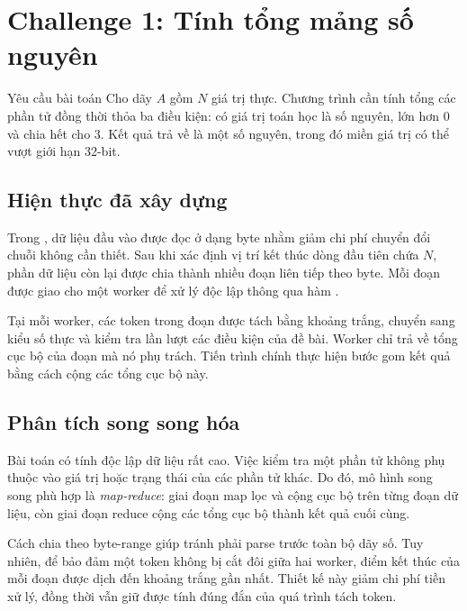 \section{Challenge 1: Tính tổng mảng số nguyên}
\label{sec:challenge1}

\begin{requirementbox}{Yêu cầu bài toán}
Cho dãy $A$ gồm $N$ giá trị thực. Chương trình cần tính tổng các phần tử đồng thời thỏa ba điều kiện: có giá trị toán học là số nguyên, lớn hơn 0 và chia hết cho 3. Kết quả trả về là một số nguyên, trong đó miền giá trị có thể vượt giới hạn 32-bit.
\end{requirementbox}

\subsection{Hiện thực đã xây dựng}
Trong , dữ liệu đầu vào được đọc ở dạng byte nhằm giảm chi phí chuyển đổi chuỗi không cần thiết. Sau khi xác định vị trí kết thúc dòng đầu tiên chứa $N$, phần dữ liệu còn lại được chia thành nhiều đoạn liên tiếp theo byte. Mỗi đoạn được giao cho một worker để xử lý độc lập thông qua hàm .

Tại mỗi worker, các token trong đoạn được tách bằng khoảng trắng, chuyển sang kiểu số thực và kiểm tra lần lượt các điều kiện của đề bài. Worker chỉ trả về tổng cục bộ của đoạn mà nó phụ trách. Tiến trình chính thực hiện bước gom kết quả bằng cách cộng các tổng cục bộ này.

\subsection{Phân tích song song hóa}
Bài toán có tính độc lập dữ liệu rất cao. Việc kiểm tra một phần tử không phụ thuộc vào giá trị hoặc trạng thái của các phần tử khác. Do đó, mô hình song song phù hợp là \textit{map-reduce}: giai đoạn map lọc và cộng cục bộ trên từng đoạn dữ liệu, còn giai đoạn reduce cộng các tổng cục bộ thành kết quả cuối cùng.

Cách chia theo byte-range giúp tránh phải parse trước toàn bộ dãy số. Tuy nhiên, để bảo đảm một token không bị cắt đôi giữa hai worker, điểm kết thúc của mỗi đoạn được dịch đến khoảng trắng gần nhất. Thiết kế này giảm chi phí tiền xử lý, đồng thời vẫn giữ được tính đúng đắn của quá trình tách token.

